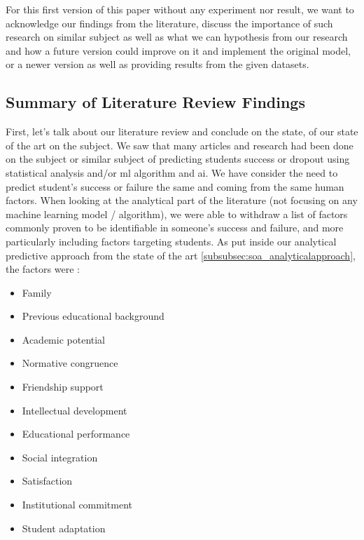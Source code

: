 \documentclass[../main.tex]{subfiles}
\begin{document}
For this first version of this paper without any experiment nor result, we want to acknowledge our findings from the literature, discuss the importance of such research on similar subject as well as what we can hypothesis from our research and how a future version could improve on it and implement the original model, or a newer version as well as providing results from the given datasets.

\subsection{Summary of Literature Review Findings}
First, let's talk about our literature review and conclude on the state, of our state of the art on the subject.
We saw that many articles and research had been done on the subject or similar subject of predicting students success or dropout using statistical analysis and/or \acrfull{ml} algorithm and \acrfull{ai}.
We have consider the need to predict student's success or failure the same and coming from the same human factors. When looking at the analytical part of the literature (not focusing on any machine learning model / algorithm), we were able to withdraw a list of factors commonly proven to be identifiable in someone's success and failure, and more particularly including factors targeting students. As put inside our analytical predictive approach from the state of the art \ref{subsubsec:soa_analyticalapproach}, the factors were : 

\begin{itemize}
    \item Family
    \item Previous educational background
    \item Academic potential
    \item Normative congruence
    \item Friendship support
    \item Intellectual development
    \item Educational performance
    \item Social integration
    \item Satisfaction
    \item Institutional commitment
    \item Student adaptation
\end{itemize}
\end{document}
